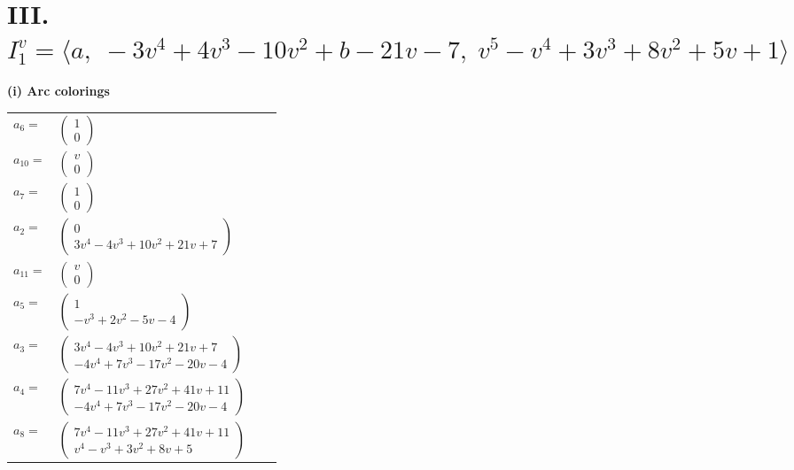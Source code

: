 \documentclass[1p]{elsarticle_modified}
\theoremstyle{definition}
\begin{document}
\centering \section*{III. $I^v_{1}= \langle a,\;-3 v^4+4 v^3-10 v^2+b-21 v-7,\;v^5- v^4+3 v^3+8 v^2+5 v+1 \rangle$}
\flushleft \textbf{(i) Arc colorings}\\
\begin{tabular}{m{7pt} m{180pt} m{7pt} m{180pt} }
\flushright $a_{6}=$&$\begin{pmatrix}1\\0\end{pmatrix}$ \\
\flushright $a_{10}=$&$\begin{pmatrix}v\\0\end{pmatrix}$ \\
\flushright $a_{7}=$&$\begin{pmatrix}1\\0\end{pmatrix}$ \\
\flushright $a_{2}=$&$\begin{pmatrix}0\\3 v^4-4 v^3+10 v^2+21 v+7\end{pmatrix}$ \\
\flushright $a_{11}=$&$\begin{pmatrix}v\\0\end{pmatrix}$ \\
\flushright $a_{5}=$&$\begin{pmatrix}1\\- v^3+2 v^2-5 v-4\end{pmatrix}$ \\
\flushright $a_{3}=$&$\begin{pmatrix}3 v^4-4 v^3+10 v^2+21 v+7\\-4 v^4+7 v^3-17 v^2-20 v-4\end{pmatrix}$ \\
\flushright $a_{4}=$&$\begin{pmatrix}7 v^4-11 v^3+27 v^2+41 v+11\\-4 v^4+7 v^3-17 v^2-20 v-4\end{pmatrix}$ \\
\flushright $a_{8}=$&$\begin{pmatrix}7 v^4-11 v^3+27 v^2+41 v+11\\v^4- v^3+3 v^2+8 v+5\end{pmatrix}$ \\

\end{tabular}
\end{document}
